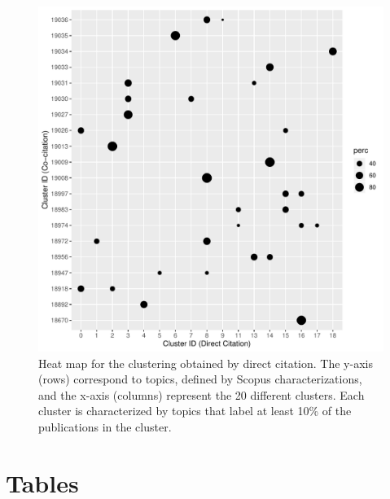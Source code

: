 \begin{figure}[ht]
  \includegraphics[scale=0.45]{graclus_cocit_fig.pdf}
\caption{Heat map for the clustering obtained by direct citation. The  y-axis (rows) correspond to topics, defined by Scopus characterizations, and the
x-axis (columns) represent the 20 different clusters.  
Each cluster is characterized by topics that label at least 10\% of the publications in the cluster.
 }
\label{fig:heatmap}       %
\end{figure}

\newpage
\clearpage
\section*{Tables}

